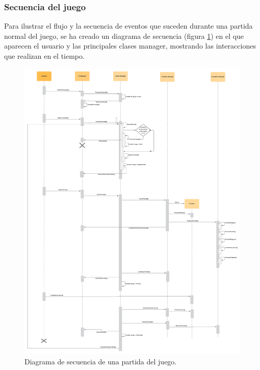 \subsubsection{Secuencia del juego}

Para ilustrar el flujo y la secuencia de eventos que suceden durante una partida normal del juego, se ha creado un diagrama de secuencia (figura \ref{fig:diagramaSecuencia}) en el que aparecen el usuario y las principales clases manager, mostrando las interacciones que realizan en el tiempo.


\begin{figure}[H]
	\centering
	\includegraphics[width=1.1\textwidth]{04.Desarrollo/05.Entrega5/01.Iteracion5_1/00.Figuras/23.diagrama_secuencia.png}
	\caption{Diagrama de secuencia de una partida del juego.}
	\label{fig:diagramaSecuencia}
\end{figure}











